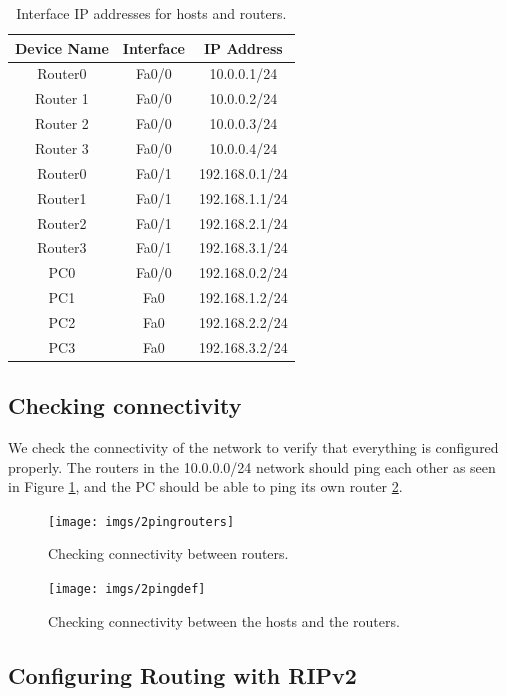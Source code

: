 \documentclass{article}
\begin{document}
\begin{table}[h]
\centering
\begin{tabular}{|c|c|c|}
\hline
Device Name & Interface & IP Address \\
\hline
Router0 & Fa0/0 & 10.0.0.1/24 \\
Router 1 & Fa0/0 &  10.0.0.2/24\\
Router 2 & Fa0/0 & 10.0.0.3/24\\
Router 3 & Fa0/0 & 10.0.0.4/24\\
Router0 & Fa0/1 & 192.168.0.1/24\\
Router1 & Fa0/1 & 192.168.1.1/24\\
Router2 & Fa0/1 & 192.168.2.1/24\\
Router3 & Fa0/1 & 192.168.3.1/24\\
PC0 & Fa0/0 & 192.168.0.2/24\\
PC1 & Fa0 & 192.168.1.2/24\\
PC2 & Fa0 & 192.168.2.2/24\\
PC3 & Fa0 & 192.168.3.2/24\\
\hline
\end{tabular}
\caption{Interface IP addresses for hosts and routers.}
\label{tab:2intip}
\end{table}


\subsection{Checking connectivity}

We check the connectivity of the network to verify that everything is configured properly. The routers in the 10.0.0.0/24 network should ping each other as seen in Figure \ref{fig:2pingrouters}, and the PC should be able to ping its own router  \ref{fig:2pingdef}. 

\begin{figure}[h]
\centering
\texttt{[image: imgs/2pingrouters]}
\caption{Checking connectivity between routers.}
\label{fig:2pingrouters}
\end{figure}

\begin{figure}[h]
\centering
\texttt{[image: imgs/2pingdef]}
\caption{Checking connectivity between the hosts and the routers.}
\label{fig:2pingdef}
\end{figure}

\subsection{Configuring Routing with RIPv2}
\end{document}

